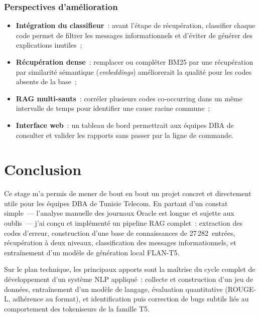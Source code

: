 \documentclass[12pt,a4paper]{report}
\begin{document}
\subsection{Perspectives d'am\'elioration}

\begin{itemize}[leftmargin=*]
  \item \textbf{Int\'egration du classifieur}~: avant l'\'etape de r\'ecup\'eration,
        classifier chaque code permet de filtrer les messages informationnels et
        d'\'eviter de g\'en\'erer des explications inutiles~;
  \item \textbf{R\'ecup\'eration dense}~: remplacer ou compl\'eter BM25 par une
        r\'ecup\'eration par similarit\'e s\'emantique (\emph{embeddings}) am\'eliorerait
        la qualit\'e pour les codes absents de la base~;
  \item \textbf{RAG multi-sauts}~: corr\'eler plusieurs codes co-occurring dans un
        m\^eme intervalle de temps pour identifier une cause racine commune~;
  \item \textbf{Interface web}~: un tableau de bord permettrait aux \'equipes DBA de
        consulter et valider les rapports sans passer par la ligne de commande.
\end{itemize}

\chapter*{Conclusion}

Ce stage m'a permis de mener de bout en bout un projet concret et directement utile
pour les \'equipes DBA de Tunisie Telecom. En partant d'un constat simple~---
l'analyse manuelle des journaux Oracle est longue et sujette aux oublis~---
j'ai con\c cu et impl\'ement\'e un pipeline RAG complet~: extraction des codes d'erreur,
construction d'une base de connaissances de 27\,282~entr\'ees, r\'ecup\'eration \`a
deux niveaux, classification des messages informationnels, et entra\^inement d'un
mod\`ele de g\'en\'eration local FLAN-T5.

Sur le plan technique, les principaux apports sont la ma\^itrise du cycle complet de
d\'eveloppement d'un syst\`eme NLP appliqu\'e~: collecte et construction d'un jeu de
donn\'ees, entra\^inement d'un mod\`ele de langage, \'evaluation quantitative
(ROUGE-L, adh\'erence au format), et identification puis correction de bugs subtils li\'es
au comportement des tokeniseurs de la famille T5.
\end{document}
